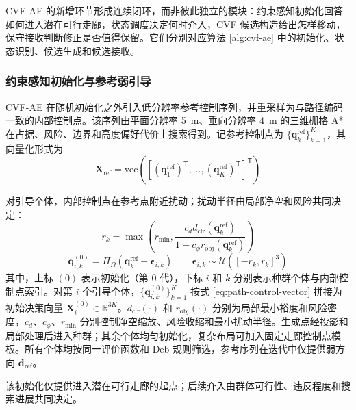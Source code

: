 CVF-AE 的新增环节形成连续闭环，而非彼此独立的模块：约束感知初始化回答如何进入潜在可行走廊，状态调度决定何时介入，CVF 候选构造给出怎样移动，保守接收判断修正是否值得保留。它们分别对应算法 \ref{alg:cvf-ae} 中的初始化、状态识别、候选生成和候选接收。

\subsubsection{约束感知初始化与参考弱引导}

CVF-AE 在随机初始化之外引入低分辨率参考控制序列，并重采样为与路径编码一致的内部控制点。该序列由平面分辨率 \SI{5}{m}、垂向分辨率 \SI{4}{m} 的三维栅格 A* 在占据、风险、边界和高度偏好代价上搜索得到。记参考控制点为 $\{\mathbf q^{\mathrm{ref}}_k\}_{k=1}^{K}$，其向量化形式为
\begin{equation}
    \mathbf X_{\mathrm{ref}}=
    \mathrm{vec}\left(
    [(\mathbf q^{\mathrm{ref}}_1)^\mathsf T,\ldots,
    (\mathbf q^{\mathrm{ref}}_K)^\mathsf T]^\mathsf T
    \right)
    \label{eq:reference-vector}
\end{equation}

对引导个体，内部控制点在参考点附近扰动；扰动半径由局部净空和风险共同决定：
\begin{equation}
    r_k=
    \max\left(
    r_{\min},
    \frac{c_d d_{\mathrm{clr}}(\mathbf q^{\mathrm{ref}}_k)}
    {1+c_\phi r_{\mathrm{obj}}(\mathbf q^{\mathrm{ref}}_k)}
    \right)
    \label{eq:init-radius}
\end{equation}
\begin{equation}
    \mathbf q^{(0)}_{i,k}
    =
    \Pi_{\Omega}
    \left(
    \mathbf q^{\mathrm{ref}}_k+\boldsymbol\epsilon_{i,k}
    \right)
    \qquad
    \boldsymbol\epsilon_{i,k}\sim\mathcal U([-r_k,r_k]^3)
    \label{eq:guided-init}
\end{equation}
其中，上标 $(0)$ 表示初始化（第 $0$ 代），下标 $i$ 和 $k$ 分别表示种群个体与内部控制点索引。对第 $i$ 个引导个体，$\{\mathbf q^{(0)}_{i,k}\}_{k=1}^{K}$ 按式 \eqref{eq:path-control-vector} 拼接为初始决策向量 $\mathbf X_i^{(0)}\in\mathbb R^{3K}$。$d_{\mathrm{clr}}(\cdot)$ 和 $r_{\mathrm{obj}}(\cdot)$ 分别为局部最小裕度和风险密度，$c_d$、$c_\phi$、$r_{\min}$ 分别控制净空缩放、风险收缩和最小扰动半径。生成点经投影和局部处理后进入种群；其余个体均匀初始化，复杂布局可加入固定走廊控制点模板。所有个体均按同一评价函数和 Deb 规则筛选，参考序列在迭代中仅提供弱方向 $\mathbf d_{\mathrm{ref}}$。

该初始化仅提供进入潜在可行走廊的起点；后续介入由群体可行性、违反程度和搜索进展共同决定。

